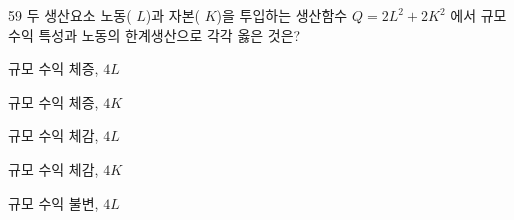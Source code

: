 \begin{question}{59}
두 생산요소 노동( $L$)과 자본( $K$)을 투입하는 생산함수 $Q=2L^{2}+2K^{2}$ 에서 규모 수익 특성과 노동의 한계생산으로 각각 옳은 것은?
\begin{choices}
  \item 규모 수익 체증, $4L$
  \item 규모 수익 체증, $4K$
  \item 규모 수익 체감, $4L$
  \item 규모 수익 체감, $4K$
  \item 규모 수익 불변, $4L$
\end{choices}
\end{question}
